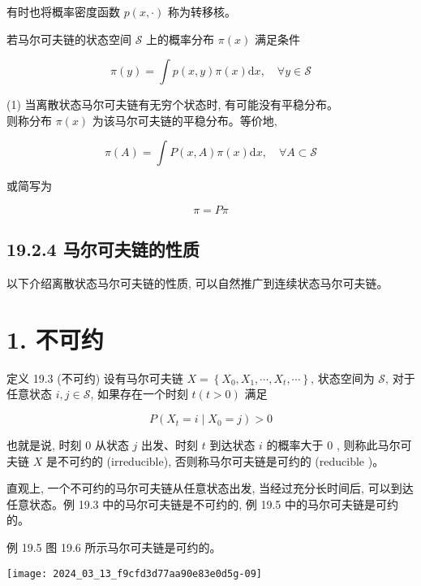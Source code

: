 \documentclass[10pt]{article}
\begin{document}
\begin{CJK*}{UTF8}{bsmi}
有时也将概率密度函数 $p(x, \cdot)$ 称为转移核。

若马尔可夫链的状态空间 $\mathcal{S}$ 上的概率分布 $\pi(x)$ 满足条件


\begin{equation*}
\pi(y)=\int p(x, y) \pi(x) \mathrm{d} x, \quad \forall y \in \mathcal{S} \tag{19.21}
\end{equation*}


(1) 当离散状态马尔可夫链有无穷个状态时, 有可能没有平稳分布。\\
则称分布 $\pi(x)$ 为该马尔可夫链的平稳分布。等价地,


\begin{equation*}
\pi(A)=\int P(x, A) \pi(x) \mathrm{d} x, \quad \forall A \subset \mathcal{S} \tag{19.22}
\end{equation*}


或简写为


\begin{equation*}
\pi=P \pi \tag{19.23}
\end{equation*}


\subsection*{19.2.4 马尔可夫链的性质}
以下介绍离散状态马尔可夫链的性质, 可以自然推广到连续状态马尔可夫链。

\section*{1. 不可约}
定义 19.3 (不可约) 设有马尔可夫链 $X=\left\{X_{0}, X_{1}, \cdots, X_{t}, \cdots\right\}$, 状态空间为 $\mathcal{S}$, 对于任意状态 $i, j \in \mathcal{S}$, 如果存在一个时刻 $t(t>0)$ 满足


\begin{equation*}
P\left(X_{t}=i \mid X_{0}=j\right)>0 \tag{19.24}
\end{equation*}


也就是说, 时刻 0 从状态 $j$ 出发、时刻 $t$ 到达状态 $i$ 的概率大于 0 , 则称此马尔可夫链 $X$ 是不可约的 (irreducible), 否则称马尔可夫链是可约的 (reducible )。

直观上, 一个不可约的马尔可夫链从任意状态出发, 当经过充分长时间后, 可以到达任意状态。例 19.3 中的马尔可夫链是不可约的, 例 19.5 中的马尔可夫链是可约的。

例 19.5 图 19.6 所示马尔可夫链是可约的。

\begin{center}
\texttt{[image: 2024\_03\_13\_f9cfd3d77aa90e83e0d5g-09]}
\end{center}


\end{CJK*}
\end{document}
